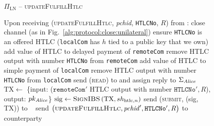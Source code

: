   \begin{figure}[H]
    \begin{protocolbox}{$\Pi_{\mathrm{LN}}$ -- \textsc{updateFulfillHtlc}}
      \begin{algorithmic}[1]
        \State Upon receiving (\textsc{updateFulfillHtlc}, \textit{pchid},
        \texttt{HTLCNo}, $R$) from \bob:
        \Indent
            \State close channel (as in
            Fig.~\ref{alg:protocol:close:unilateral})
            \State \Return
          \EndIf
          \State ensure \texttt{HTLCNo} is an offered HTLC (\texttt{localCom}
          has $h$ tied to a public key that we own)
          \State add value of HTLC to delayed payment of \texttt{remoteCom}
          \State remove HTLC output with number \texttt{HTLCNo} from
          \texttt{remoteCom}
          \State add value of HTLC to simple payment of \texttt{localCom}
          \State remove HTLC output with number \texttt{HTLCNo} from
          \texttt{localCom}
           
            \State send (\textsc{read}) to \ledger{} and assign reply to
            $\Sigma_{\mathit{Alice}}$
              \State $\mathrm{TX} \gets$ \{input: ($\mathtt{remoteCom}'$ HTLC
              output with number $\mathtt{HTLCNo}', R$), output:
              $pk_{\mathit{Alice}}$\}
              \State $\mathrm{sig} \gets \textsc{SignIBS}\left(\mathrm{TX},
              sh_{\mathrm{htlc}, n}\right)$
              \State send (\textsc{submit}, (sig, TX)) to \ledger{}
              \label{alg:protocol:pay:updateFulfillHtlc:submit}
            \Else \ 
              \State {}
              \State send $\left(\textsc{updateFulfillHtlc}, \mathit{pchid}',
              \mathtt{HTLCNo}', R\right)$ to counterparty
            \EndIf
          \EndIf
        \EndIndent
      \end{algorithmic}
    \end{protocolbox}
    \caption{}
    \label{alg:protocol:pay:updateFulfillHtlc}
  \end{figure}

